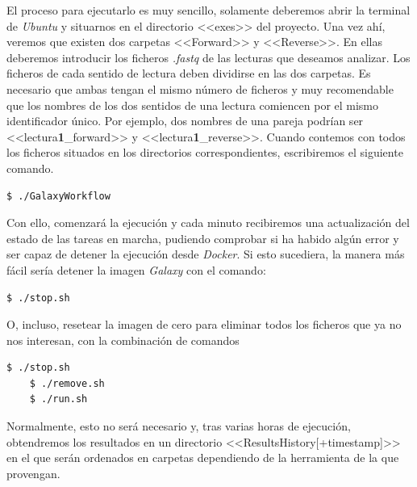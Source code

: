 El proceso para ejecutarlo es muy sencillo, solamente deberemos abrir la terminal de \textit{Ubuntu} y situarnos en el directorio <<exes>> del proyecto. Una vez ahí, veremos que existen dos carpetas <<Forward>> y <<Reverse>>. En ellas deberemos introducir los ficheros \textit{.fastq} de las lecturas que deseamos analizar. Los ficheros de cada sentido de lectura deben dividirse en las dos carpetas. Es necesario que ambas tengan el mismo número de ficheros y muy recomendable que los nombres de los dos sentidos de una lectura comiencen por el mismo identificador único. Por ejemplo, dos nombres de una pareja podrían ser  <<lectura\textbf{1}\_forward>> y <<lectura\textbf{1}\_reverse>>. Cuando contemos con todos los ficheros situados en los directorios correspondientes, escribiremos el siguiente comando.
\begin{lstlisting}[language=bash]
    $ ./GalaxyWorkflow
\end{lstlisting}
Con ello, comenzará la ejecución y cada minuto recibiremos una actualización del estado de las tareas en marcha, pudiendo comprobar si ha habido algún error y ser capaz de detener la ejecución desde \textit{Docker}. Si esto sucediera, la manera más fácil sería detener la imagen \textit{Galaxy} con el comando:
\begin{lstlisting}[language=bash]
    $ ./stop.sh
\end{lstlisting}
O, incluso, resetear la imagen de cero para eliminar todos los ficheros que ya no nos interesan, con la combinación de comandos
\begin{lstlisting}[language=bash]
    $ ./stop.sh
    $ ./remove.sh
    $ ./run.sh
\end{lstlisting}
Normalmente, esto no será necesario y, tras varias horas de ejecución, obtendremos los resultados en un directorio <<ResultsHistory[+timestamp]>> en el que serán ordenados en carpetas dependiendo de la herramienta de la que provengan.


